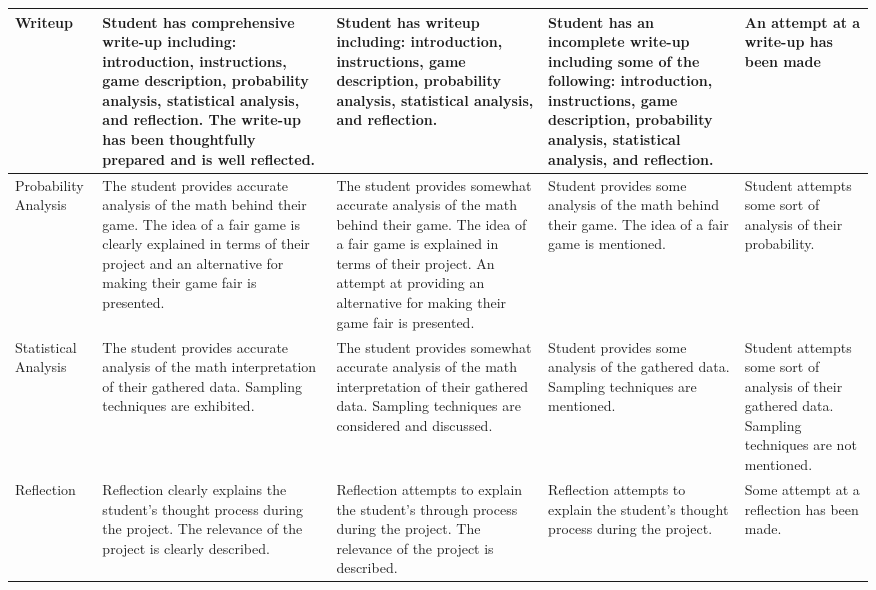 \documentclass[11pt]{article}
\begin{document}
\begin{table}[]
\begin{tabular}{|p{1.5cm}|p{4cm}|p{4cm}|p{4cm}|p{2.5cm}|}
Writeup                   & Student has comprehensive write-up including: introduction, instructions, game description, probability analysis, statistical analysis, and reflection.  The write-up has been thoughtfully prepared and is well reflected. & Student has writeup including: introduction, instructions, game description, probability analysis, statistical analysis, and reflection.                                                                                         & Student has an incomplete write-up including some of the following: introduction, instructions, game description, probability analysis, statistical analysis, and reflection. & An attempt at a write-up has been made                                                                 \\ \hline
Probability Analysis      & The student provides accurate analysis of the math behind their game.  The idea of a fair game is clearly explained in terms of their project and an alternative for making their game fair is presented.                   & The student provides somewhat accurate analysis of the math behind their game.  The idea of a fair game is explained in terms of their project.  An attempt at providing an alternative for making their game fair is presented. & Student provides some analysis of the math behind their game.  The idea of a fair game is mentioned.                                                                          & Student attempts some sort of analysis of their probability.                                           \\ \hline
Statistical Analysis      & The student provides accurate analysis of the math interpretation of their gathered data.  Sampling techniques are exhibited.                                                                                               & The student provides somewhat accurate analysis of the math interpretation of their gathered data.  Sampling techniques are considered and discussed.                                                                            & Student provides some analysis of the gathered data.  Sampling techniques are mentioned.                                                                                      & Student attempts some sort of analysis of their gathered data.  Sampling techniques are not mentioned. \\ \hline
Reflection                & Reflection clearly explains the student's thought process during the project. The relevance of the project is clearly described.                                                                                            & Reflection attempts to explain the student's through process during the project.  The relevance of the project is described.                                                                                                     & Reflection attempts to explain the student's thought process during the project.                                                                                              & Some attempt at a reflection has been made.                                                            \\ \hline

\end{tabular}
\end{table}
\end{document}
